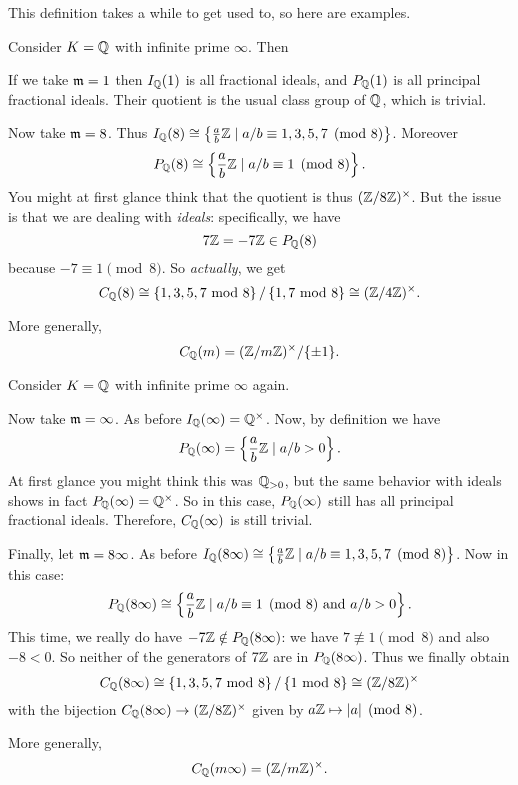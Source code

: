 This definition takes a while to get used to, so here are examples.
\begin{example}
	Consider $K = \mathbb Q$ with infinite prime $\infty$. Then
	\begin{itemize}
		\ii If we take $\mathfrak m = 1$ then $I_\mathbb Q(1)$ is all fractional ideals,
		and $P_\mathbb Q(1)$ is all principal fractional ideals.
		Their quotient is the usual class group of $\mathbb Q$, which is trivial.

		\ii Now take $\mathfrak m = 8$.
		Thus $I_\mathbb Q(8) \cong \left\{ \frac ab\mathbb Z \mid
			a/b \equiv 1,3,5,7 \pmod 8 \right\}$.
		Moreover 
		\[ P_\mathbb Q(8) \cong \left\{ \frac ab\mathbb Z \mid
			a/b \equiv 1 \pmod 8 \right\}. \]
		You might at first glance think that
		the quotient is thus $(\mathbb Z/8\mathbb Z)^\times$.
		But the issue is that we are dealing with \emph{ideals}:
		specifically, we have
		\[ 7\mathbb Z = -7\mathbb Z \in P_\mathbb Q(8) \]
		because $-7 \equiv 1 \pmod 8$.
		So \emph{actually}, we get
		\[
			C_\mathbb Q(8)
			\cong \left\{ 1,3,5,7 \text{ mod } 8 \right\}
			/ \left\{ 1,7 \text{ mod } 8 \right\}
			\cong (\mathbb Z/4\mathbb Z)^\times.
		\]
	\end{itemize}
	More generally,
	\[ C_\mathbb Q(m) = (\mathbb Z/m\mathbb Z)^\times / \{\pm1\}. \]
\end{example}
\begin{example}
	Consider $K = \mathbb Q$ with infinite prime $\infty$ again.
	\begin{itemize}
		\ii Now take $\mathfrak m = \infty$.
		As before $I_\mathbb Q(\infty) = \mathbb Q^\times$.
		Now, by definition we have
		\[ P_\mathbb Q(\infty) = \left\{ \frac ab \mathbb Z \mid a/b > 0 \right\}. \]
		At first glance you might think this was $\mathbb Q_{>0}$,
		but the same behavior with ideals shows in fact $P_\mathbb Q(\infty) = \mathbb Q^\times$.
		So in this case, $P_\mathbb Q(\infty)$ still has all principal fractional ideals.
		Therefore, $C_\mathbb Q(\infty)$ is still trivial.

		\ii Finally, let $\mathfrak m = 8\infty$.
		As before $I_\mathbb Q(8\infty) \cong \left\{ \frac ab\mathbb Z \mid
			a/b \equiv 1,3,5,7 \pmod 8 \right\}$.
		Now in this case:
		\[ P_\mathbb Q(8\infty) \cong \left\{ \frac ab\mathbb Z \mid 
			a/b \equiv 1 \pmod 8 \text{ and } a/b > 0 \right\}.  \]
		This time, we really do have $-7\mathbb Z \notin P_\mathbb Q(8\infty)$:
		we have $7 \not\equiv 1 \pmod 8$ and also $-8 < 0$.
		So neither of the generators of $7\mathbb Z$ are in $P_\mathbb Q(8\infty)$.
		Thus we finally obtain
		\[
			C_\mathbb Q(8\infty)
			\cong \left\{ 1,3,5,7 \text{ mod } 8 \right\}
			/ \left\{ 1 \text{ mod } 8 \right\}
			\cong (\mathbb Z/8\mathbb Z)^\times
		\]
		with the bijection $C_\mathbb Q(8\infty) \to (\mathbb Z/8\mathbb Z)^\times$
		given by $a\mathbb Z \mapsto |a| \pmod 8$.
	\end{itemize}
	More generally,
	\[ C_\mathbb Q(m\infty) = (\mathbb Z/m\mathbb Z)^\times. \]
\end{example}

